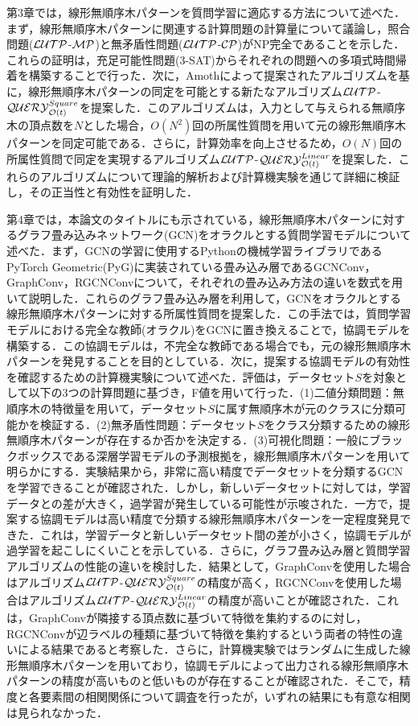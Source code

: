第3章では，線形無順序木パターンを質問学習に適応する方法について述べた．まず，線形無順序木パターンに関連する計算問題の計算量について議論し，照合問題(${\cal LUTP}$-${\cal MP}$)と無矛盾性問題(${\cal LUTP}$-${\cal CP}$)がNP完全であることを示した．これらの証明は，充足可能性問題(3-SAT)からそれぞれの問題への多項式時間帰着を構築することで行った．次に，Amoth\cite{amoth-ml2001}によって提案されたアルゴリズムを基に，線形無順序木パターンの同定を可能とする新たなアルゴリズム${\cal LUTP}$-${\cal QUERY}_{{\cal O}(t)}^{Square}$を提案した．このアルゴリズムは，入力として与えられる無順序木の頂点数を$N$とした場合，$O(N^2)$回の所属性質問を用いて元の線形無順序木パターンを同定可能である．さらに，計算効率を向上させるため，$O(N)$回の所属性質問で同定を実現するアルゴリズム${\cal LUTP}$-${\cal QUERY}_{{\cal O}(t)}^{Linear}$を提案した．これらのアルゴリズムについて理論的解析および計算機実験を通じて詳細に検証し，その正当性と有効性を証明した．

第4章では，本論文のタイトルにも示されている，線形無順序木パターンに対するグラフ畳み込みネットワーク(GCN)をオラクルとする質問学習モデルについて述べた．まず，GCNの学習に使用するPythonの機械学習ライブラリであるPyTorch Geometric(PyG)に実装されている畳み込み層であるGCNConv，GraphConv，RGCNConvについて，それぞれの畳み込み方法の違いを数式を用いて説明した．これらのグラフ畳み込み層を利用して，GCNをオラクルとする線形無順序木パターンに対する所属性質問を提案した．この手法では，質問学習モデルにおける完全な教師(オラクル)をGCNに置き換えることで，協調モデルを構築する．この協調モデルは，不完全な教師である場合でも，元の線形無順序木パターンを発見することを目的としている．次に，提案する協調モデルの有効性を確認するための計算機実験について述べた．評価は，データセット$S$を対象として以下の3つの計算問題に基づき，F値を用いて行った．(1)二値分類問題：無順序木の特徴量を用いて，データセット$S$に属す無順序木が元のクラスに分類可能かを検証する．(2)無矛盾性問題：データセット$S$をクラス分類するための線形無順序木パターンが存在するか否かを決定する．(3)可視化問題：一般にブラックボックスである深層学習モデルの予測根拠を，線形無順序木パターンを用いて明らかにする．実験結果から，非常に高い精度でデータセットを分類するGCNを学習できることが確認された．しかし，新しいデータセットに対しては，学習データとの差が大きく，過学習が発生している可能性が示唆された．一方で，提案する協調モデルは高い精度で分類する線形無順序木パターンを一定程度発見できた．これは，学習データと新しいデータセット間の差が小さく，協調モデルが過学習を起こしにくいことを示している．さらに，グラフ畳み込み層と質問学習アルゴリズムの性能の違いを検討した．結果として，GraphConvを使用した場合はアルゴリズム${\cal LUTP}$-${\cal QUERY}_{{\cal O}(t)}^{Square}$の精度が高く，RGCNConvを使用した場合はアルゴリズム${\cal LUTP}$-${\cal QUERY}_{{\cal O}(t)}^{Linear}$の精度が高いことが確認された．これは，GraphConvが隣接する頂点数に基づいて特徴を集約するのに対し，RGCNConvが辺ラベルの種類に基づいて特徴を集約するという両者の特性の違いによる結果であると考察した．さらに，計算機実験ではランダムに生成した線形無順序木パターンを用いており，協調モデルによって出力される線形無順序木パターンの精度が高いものと低いものが存在することが確認された．そこで，精度と各要素間の相関関係について調査を行ったが，いずれの結果にも有意な相関は見られなかった．

